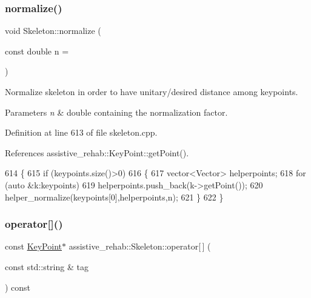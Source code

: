 \subsubsection{\texorpdfstring{normalize()}{normalize()}}
{\footnotesize\ttfamily void Skeleton\+::normalize (\begin{DoxyParamCaption}\item[{const double}]{n = {} }\end{DoxyParamCaption})\hspace{0.3cm}{\ttfamily [inherited]}}



Normalize skeleton in order to have unitary/desired distance among keypoints. 


\begin{DoxyParams}{Parameters}
{\em n} & double containing the normalization factor. \\
\hline
\end{DoxyParams}


Definition at line 613 of file skeleton.\+cpp.



References assistive\+\_\+rehab\+::\+Key\+Point\+::get\+Point().


\begin{DoxyCode}
614 \{
615     \textcolor{keywordflow}{if} (keypoints.size()>0)
616     \{
617         vector<Vector> helperpoints;
618         \textcolor{keywordflow}{for} (\textcolor{keyword}{auto} &k:keypoints)
619             helperpoints.push\_back(k->getPoint());
620         helper\_normalize(keypoints[0],helperpoints,n);
621     \}
622 \}
\end{DoxyCode}
\mbox{\label{classassistive__rehab_1_1Skeleton_a3ecc7418af653c88e40d41bb379b7271}} 
\subsubsection{\texorpdfstring{operator[]()}{operator[]()}\hspace{0.1cm}{\footnotesize\ttfamily [1/2]}}
{\footnotesize\ttfamily const \hyperlink{classassistive__rehab_1_1KeyPoint}{Key\+Point}$\ast$ assistive\+\_\+rehab\+::\+Skeleton\+::operator\mbox{[}$\,$\mbox{]} (\begin{DoxyParamCaption}\item[{const std\+::string \&}]{tag }\end{DoxyParamCaption}) const\hspace{0.3cm}{\ttfamily [inherited]}}



